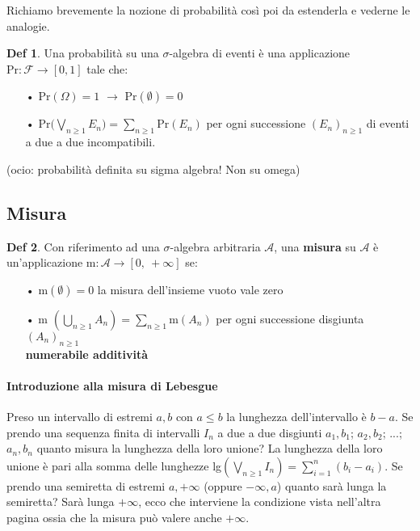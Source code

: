 \documentclass[a4paper,11pt]{article}
\theoremstyle{plain}
\theoremstyle{definition}
\newtheorem{defn}{Def}[section]
\theoremstyle{remark}
\begin{document}
Richiamo brevemente la nozione di probabilità così poi da estenderla e vederne le analogie.

\begin{defn}
 Una probabilità su una $\sigma$-algebra di eventi è una  applicazione  $\mathrm{P}\mathrm{r}:\mathcal{F}\rightarrow [0,1]$ tale che:
\begin{itemize}

\item[•]$\mathrm{P}\mathrm{r}(\Omega)=1$ $\rightarrow$ $\mathrm{P}\mathrm{r}(\emptyset)=0$

\item[•]$\displaystyle \mathrm{P}\mathrm{r}(\bigvee_{n \geq 1}{E_{n})}=
\sum_{n\geq 1}\mathrm{P}\mathrm{r}(E_{n})$
 per ogni successione $(E_{n})_{n\geq 1}$ di eventi a due a due incompatibili.
\end{itemize}
\end{defn}
(ocio: probabilità definita su sigma algebra! Non su omega)

\subsection{Misura}
\begin{defn}
Con riferimento ad una $\sigma$-algebra arbitraria $\mathcal{A}$, una \textbf{misura} su $\mathcal{A}$ è un'applicazione $\mathrm{m}:\mathcal{A}\rightarrow[0,\ +\infty]$  se:
\begin{itemize}

\item[•]$\mathrm{m}(\emptyset)=0$ la misura dell'insieme vuoto vale zero

\item[•]m $(\displaystyle \bigcup_{n\geq 1}A_{n})=\sum_{n\geq 1}\mathrm{m}(A_{n})$ per ogni successione disgiunta $(A_{n})_{n\geq 1}$\\ \textbf{numerabile additività}
\end{itemize}
\end{defn}



\paragraph{Introduzione alla misura di Lebesgue} Preso un intervallo di estremi $a,b  $ con $a \leq b$ la lunghezza dell'intervallo è $b-a$. Se prendo una sequenza finita di intervalli $I_n$ a due a due disgiunti $a_1,b_1$; $a_2,b_2$; $...$; $a_n,b_n$ quanto misura la lunghezza della loro unione? La lunghezza della loro unione è pari alla somma delle lunghezze lg$(\bigvee_{n \geq 1}{I_n})=\sum_{i=1}^{n}{(b_i-a_i)}$. Se prendo una semiretta di estremi $a, +\infty$ (oppure $-\infty, a$) quanto sarà lunga la semiretta? Sarà lunga $+\infty$, ecco che interviene la condizione vista nell'altra pagina ossia che la misura può valere anche $+\infty$.\\
\end{document}

